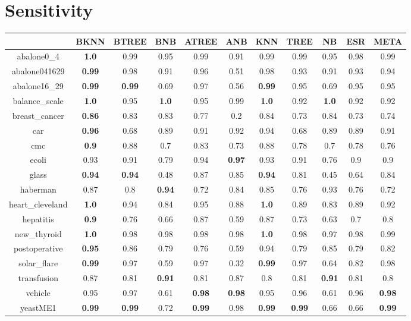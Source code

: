 \documentclass{article}%
\begin{document}
\section*{Sensitivity}%
\begin{tabular}{c|cccccccccc}%
\hline%
&BKNN&BTREE&BNB&ATREE&ANB&KNN&TREE&NB&ESR&META\\%
\hline%
abalone0\_4&\textbf{1.0}&0.99&0.95&0.99&0.91&0.99&0.99&0.95&0.98&0.99\\%
\hline%
abalone041629&\textbf{0.99}&0.98&0.91&0.96&0.51&0.98&0.93&0.91&0.93&0.94\\%
\hline%
abalone16\_29&\textbf{0.99}&\textbf{0.99}&0.69&0.97&0.56&\textbf{0.99}&0.95&0.69&0.95&0.95\\%
\hline%
balance\_scale&\textbf{1.0}&0.95&\textbf{1.0}&0.95&0.99&\textbf{1.0}&0.92&\textbf{1.0}&0.92&0.92\\%
\hline%
breast\_cancer&\textbf{0.86}&0.83&0.83&0.77&0.2&0.84&0.73&0.84&0.73&0.74\\%
\hline%
car&\textbf{0.96}&0.68&0.89&0.91&0.92&0.94&0.68&0.89&0.89&0.91\\%
\hline%
cmc&\textbf{0.9}&0.88&0.7&0.83&0.73&0.88&0.78&0.7&0.78&0.76\\%
\hline%
ecoli&0.93&0.91&0.79&0.94&\textbf{0.97}&0.93&0.91&0.76&0.9&0.9\\%
\hline%
glass&\textbf{0.94}&\textbf{0.94}&0.48&0.87&0.85&\textbf{0.94}&0.81&0.45&0.64&0.84\\%
\hline%
haberman&0.87&0.8&\textbf{0.94}&0.72&0.84&0.85&0.76&0.93&0.76&0.72\\%
\hline%
heart\_cleveland&\textbf{1.0}&0.94&0.84&0.95&0.88&\textbf{1.0}&0.89&0.83&0.89&0.92\\%
\hline%
hepatitis&\textbf{0.9}&0.76&0.66&0.87&0.59&0.87&0.73&0.63&0.7&0.8\\%
\hline%
new\_thyroid&\textbf{1.0}&0.98&0.98&0.98&0.98&\textbf{1.0}&0.98&0.97&0.98&0.99\\%
\hline%
postoperative&\textbf{0.95}&0.86&0.79&0.76&0.59&0.94&0.79&0.85&0.79&0.82\\%
\hline%
solar\_flare&\textbf{0.99}&0.97&0.59&0.97&0.32&\textbf{0.99}&0.97&0.64&0.82&0.98\\%
\hline%
transfusion&0.87&0.81&\textbf{0.91}&0.81&0.87&0.8&0.81&\textbf{0.91}&0.81&0.8\\%
\hline%
vehicle&0.95&0.97&0.61&\textbf{0.98}&\textbf{0.98}&0.95&0.96&0.61&0.96&\textbf{0.98}\\%
\hline%
yeastME1&\textbf{0.99}&\textbf{0.99}&0.72&\textbf{0.99}&0.98&\textbf{0.99}&\textbf{0.99}&0.66&0.66&\textbf{0.99}\\%

\end{tabular}
\end{document}
